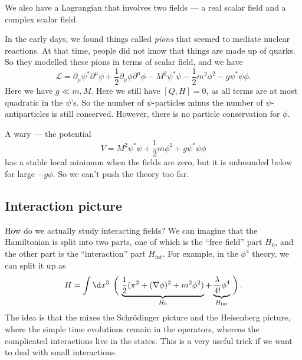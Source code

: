 \documentclass[a4paper]{article}
\begin{document}
We also have a Lagrangian that involves two fields --- a real scalar field and a complex scalar field.
\begin{eg}
  In the early days, we found things called \emph{pions} that seemed to mediate nuclear reactions. At that time, people did not know that things are made up of quarks. So they modelled these pions in terms of scalar field, and we have
  \[
    \mathcal{L} = \partial_\mu \psi^* \partial^\mu \psi + \frac{1}{2} \partial_\mu \phi \partial^\mu \phi - M^2 \psi^* \psi - \frac{1}{2} m^2 \phi^2 - g \psi^* \psi \phi.
  \]
  Here we have $g \ll m, M$. Here we still have $[Q, H] = 0$, as all terms are at most quadratic in the $\psi$'s. So the number of $\psi$-particles minus the number of $\psi$-antiparticles is still conserved. However, there is no particle conservation for $\phi$.

  A wary --- the potential
  \[
    V = M^2 \psi^* \psi + \frac{1}{2} m \phi^2 + g \psi^*\psi \phi
  \]
  has a stable local minimum when the fields are zero, but it is unbounded below for large $-g \phi$. So we can't push the theory too far.
\end{eg}

\subsection{Interaction picture}
How do we actually study interacting fields? We can imagine that the Hamiltonian is split into two parts, one of which is the ``free field'' part $H_0$, and the other part is the ``interaction'' part $H_{\mathrm{int}}$. For example, in the $\phi^4$ theory, we can split it up as
\[
  H = \int\d x^3\;\left(\vphantom{\frac{\lambda}{4}}\right.\underbrace{\frac{1}{2} (\pi^2 + (\nabla \phi)^2 + m^2 \phi^2)}_{H_0} + \underbrace{\frac{\lambda}{4!} \phi^4}_{H_{\mathrm{int}}}\left.\vphantom{\frac{\lambda}{4!}}\right).
\]
The idea is that the  mixes the Schr\"odinger picture and the Heisenberg picture, where the simple time evolutions remain in the operators, whereas the complicated interactions live in the states. This is a very useful trick if we want to deal with small interactions.
\end{document}
